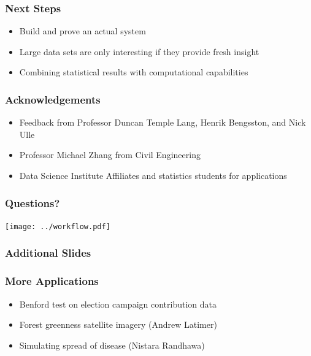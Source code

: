 \documentclass{beamer}
\begin{document}
\begin{frame}

    \frametitle{Next Steps}

\begin{itemize}
    \item Build and prove an actual system
\item Large data sets are only interesting if they provide fresh insight
\item Combining statistical results with computational capabilities
\end{itemize}

\end{frame}
\begin{frame}

    \frametitle{Acknowledgements}

\begin{itemize}
    \item Feedback from Professor Duncan Temple Lang, Henrik Bengsston, and Nick Ulle
    \item Professor Michael Zhang from Civil Engineering
    \item Data Science Institute Affiliates and statistics students for
        applications
\end{itemize}

\end{frame}
\begin{frame}

    \frametitle{Questions?}
    \centerline{\texttt{[image: ../workflow.pdf]}}

\end{frame}
\begin{frame}

    \frametitle{Additional Slides}

\end{frame}
\begin{frame}

    \frametitle{More Applications}


\begin{itemize}
    \item Benford test on election campaign contribution data
    \item Forest greenness satellite imagery (Andrew Latimer)
    \item Simulating spread of disease (Nistara Randhawa)
\end{itemize}

\end{frame}
\end{document}
